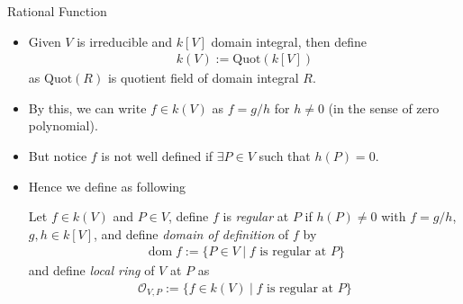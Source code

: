 \documentclass[8pt]{beamer}
\newcommand{\OO}{\mathcal{O}}
\theoremstyle{definition}
\begin{document}
    \begin{frame}{Rational Function}
        \begin{itemize}
            \item Given $V$ is irreducible and $k[V]$ domain integral, then define 
            \begin{align*}
                k(V) := \text{Quot}(k[V])
            \end{align*}  
            as $\text{Quot}(R)$ is quotient field of domain integral $R$. 

            \item By this, we can write $f \in k(V)$ as $f = g/h$ for $h \neq 0$ (in the sense of zero polynomial).  
            \item But notice $f$ is not well defined if $\exists P  \in V$ such that $h(P) = 0$.    
            \item Hence we define as following 
            \begin{definition}
                Let $f \in k(V)$ and $P \in V$, define $f$ is \emph{regular} at $P$ if $h(P) \neq 0$ with $f = g/h$, $g,h \in k[V]$, and define \emph{domain of definition} of $f$ by 
                \begin{align*}
                    \operatorname{dom} f := \{ P \in V \hspace{3pt} | \hspace{3pt} f \text{ is regular at } P \}
                \end{align*}   
                and define \emph{local ring} of $V$ at $P$ as 
                \begin{align*}
                    \OO_{V, P} := \{ f \in k(V) \hspace{3pt} | \hspace{3pt} f \text{ is regular at } P \}
                \end{align*}      
            \end{definition}
            
        \end{itemize}

        
    \end{frame}
\end{document}
